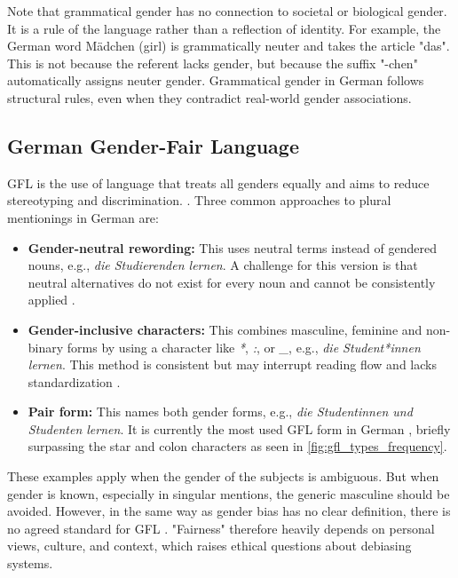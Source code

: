         Note that grammatical gender has no connection to societal or biological gender. It is a rule of the language rather than a reflection of identity. For example, the German word Mädchen (girl) is grammatically neuter and takes the article "das". This is not because the referent lacks gender, but because the suffix "-chen" automatically assigns neuter gender. Grammatical gender in German follows structural rules, even when they contradict real-world gender associations.

    \subsection{German Gender-Fair Language} \label{subsection:german_gfl}
    GFL is the use of language that treats all genders equally and aims to reduce stereotyping and discrimination. \parencite{sczesnyCanGenderFairLanguage2016}. Three common approaches to plural mentionings in German are: 

    \begin{itemize}
        \item \textbf{Gender-neutral rewording:}  
        This uses neutral terms instead of gendered nouns, e.g., \textit{die Studierenden lernen}. A challenge for this version is that neutral alternatives do not exist for every noun and cannot be consistently applied \parencite{lardelliBuildingBridgesDataset2024}.

        \item \textbf{Gender-inclusive characters:}  
        This combines masculine, feminine and non-binary forms by using a character like \textit{*}, \textit{:}, or \textit{\_}, e.g., \textit{die Student*innen lernen}. This method is consistent but may interrupt reading flow and lacks standardization \parencite{lardelliBuildingBridgesDataset2024}.

        \item \textbf{Pair form:}  
        This names both gender forms, e.g., \textit{die Studentinnen und Studenten lernen}. It is currently the most used GFL form in German \parencite{waldendorfWordsChangeIncrease2024}, briefly surpassing the star and colon characters as seen in \autoref{fig:gfl_types_frequency}.
    \end{itemize}

    These examples apply when the gender of the subjects is ambiguous. But when gender is known, especially in singular mentions, the generic masculine should be avoided. However, in the same way as gender bias has no clear definition, there is no agreed standard for GFL \parencite{lardelliBuildingBridgesDataset2024, savoldiDecadeGenderBias2025}. "Fairness" therefore heavily depends on personal views, culture, and context, which raises ethical questions about debiasing systems.

